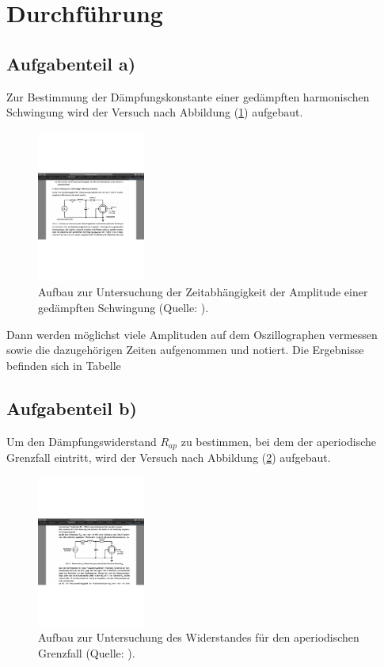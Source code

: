\newpage
\section{Durchführung}
\subsection{Aufgabenteil a)}
Zur Bestimmung der Dämpfungskonstante einer gedämpften harmonischen Schwingung wird der Versuch nach Abbildung (\ref{fig:aufbaua}) aufgebaut.

\begin{figure}
    \centering
       \includegraphics[height=5cm]{aufbaua.pdf}
       \caption{Aufbau zur Untersuchung der Zeitabhängigkeit der Amplitude einer gedämpften Schwingung (Quelle: \cite{V354}).}
       \label{fig:aufbaua}
\end{figure}

\noindent
Dann werden möglichst viele Amplituden auf dem Oszillographen vermessen sowie die dazugehörigen Zeiten aufgenommen und notiert.
Die Ergebnisse befinden sich in Tabelle %

\subsection{Aufgabenteil b)}
Um den Dämpfungswiderstand $R_{ap}$ zu bestimmen, 
bei dem der aperiodische Grenzfall eintritt,
wird der Versuch nach Abbildung (\ref{fig:aufbaub}) aufgebaut.

\begin{figure}
    \centering
       \includegraphics[height=5cm]{aufbaub.pdf}
       \caption{Aufbau zur Untersuchung des Widerstandes für den aperiodischen Grenzfall (Quelle: \cite{V354}).}
       \label{fig:aufbaub}
\end{figure}

